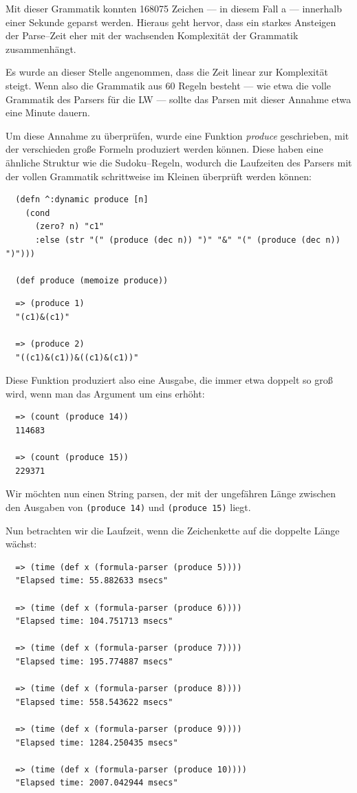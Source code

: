 \documentclass[ngerman,a4paper,abstracton,open=right,twoside=false,toc=listofnumbered,bibtotocnumbered]{scrreprt}
\begin{document}
Mit dieser Grammatik konnten 168075 Zeichen --- in diesem Fall \glqq{}a\grqq{} --- innerhalb einer Sekunde geparst werden. Hieraus geht hervor, dass ein starkes Ansteigen der Parse--Zeit eher mit der wachsenden Komplexität der Grammatik zusammenhängt.

Es wurde an dieser Stelle angenommen, dass die Zeit linear zur Komplexität steigt. Wenn also die Grammatik aus 60 Regeln besteht --- wie etwa die volle Grammatik des Parsers für die LW --- sollte das Parsen mit dieser Annahme etwa eine Minute dauern.

Um diese Annahme zu überprüfen, wurde eine Funktion \emph{produce} geschrieben, mit der verschieden große Formeln produziert werden können. Diese haben eine ähnliche Struktur wie die Sudoku--Regeln, wodurch die Laufzeiten des Parsers mit der vollen Grammatik schrittweise im Kleinen überprüft werden können:

\begin{lstlisting}
  (defn ^:dynamic produce [n]
    (cond
      (zero? n) "c1"
      :else (str "(" (produce (dec n)) ")" "&" "(" (produce (dec n)) ")")))

  (def produce (memoize produce))
\end{lstlisting}

\begin{lstlisting}
  => (produce 1)
  "(c1)&(c1)"

  => (produce 2)
  "((c1)&(c1))&((c1)&(c1))"
\end{lstlisting}

Diese Funktion produziert also eine Ausgabe, die immer etwa doppelt so groß wird, wenn man das Argument um eins erhöht:

\begin{lstlisting}
  => (count (produce 14))
  114683

  => (count (produce 15))
  229371
\end{lstlisting}

Wir möchten nun einen String parsen, der mit der ungefähren Länge zwischen den Ausgaben von \lstinline|(produce 14)| und \lstinline|(produce 15)| liegt.

Nun betrachten wir die Laufzeit, wenn die Zeichenkette auf die doppelte Länge wächst:

\begin{lstlisting}
  => (time (def x (formula-parser (produce 5))))
  "Elapsed time: 55.882633 msecs"

  => (time (def x (formula-parser (produce 6))))
  "Elapsed time: 104.751713 msecs"

  => (time (def x (formula-parser (produce 7))))
  "Elapsed time: 195.774887 msecs"

  => (time (def x (formula-parser (produce 8))))
  "Elapsed time: 558.543622 msecs"

  => (time (def x (formula-parser (produce 9))))
  "Elapsed time: 1284.250435 msecs"

  => (time (def x (formula-parser (produce 10))))
  "Elapsed time: 2007.042944 msecs"
\end{lstlisting}
\end{document}
